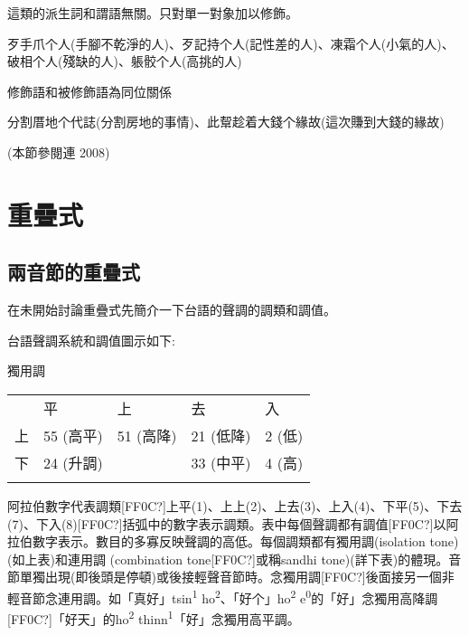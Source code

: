 \textrm{這類的派生詞和謂語無關。只對單一對象加以修飾。}

\textrm{歹手爪个人(手腳不乾淨的人)}、\textrm{歹記持个人(記性差的人)}、\textrm{凍霜个人(小氣的人)}、\textrm{破相个人(殘缺的人)}、\textrm{躼骹个人(高挑的人)}

\begin{listWWviiiNumxivleveli}
\item \begin{styleqwerty}\rmfamily
修飾語和被修飾語為同位關係
\end{styleqwerty}
\end{listWWviiiNumxivleveli}

\textrm{分割厝地个代誌(分割房地的事情)}、\textrm{此幚趁着大錢个緣故(這次賺到大錢的緣故)}

\rmfamily
(本節參閱連 2008)

\section{\rmfamily 重疊式}
\subsection{\rmfamily 兩音節的重疊式}

\textrm{在未開始討論重疊式先簡介一下台語的聲調的調類和調值。}

\rmfamily
台語聲調系統和調值圖示如下:

獨用調

\tablefirsthead{}

\tabletail{}
\tablelasttail{}
\begin{tabularx}{\textwidth}{XXXXX} & 平 & 上 & 去 & 入\\
\lsptoprule
上 & 55 (高平) & 51 (高降) & 21 (低降) & 2 (低)\\
下 & 24 (升調) &  & 33 (中平) & 4 (高)\\
\lspbottomrule
\end{tabularx}
\textrm{阿拉伯數字代表調類[FF0C?]上平(1)}、\textrm{上上(2)}、\textrm{上去(3)}、\textrm{上入(4)}、\textrm{下平(5)}、\textrm{下去(7)}、\textrm{下入(8)}[FF0C?]\textrm{括弧中的數字表示調類。表中每個聲調都有調值[FF0C?]以阿拉伯數字表示。數目的多寡反映聲調的高低。每個調類都有獨用調(isolation tone)(如上表)和連用調 (combination tone[FF0C?]或稱sandhi tone)(詳下表)的體現。音節單獨出現(即後頭是停頓)或後接輕聲音節時。念獨用調[FF0C?]後面接另一個非輕音節念連用調。如「真好」tsin}\textrm{\textsuperscript{1}} \textrm{ho}\textrm{\textsuperscript{2}}、\textrm{「好个」ho}\textrm{\textsuperscript{2}} \textrm{e}\textrm{\textsuperscript{0}}\textrm{的「好」念獨用高降調[FF0C?]「好天」的ho}\textrm{\textsuperscript{2}} \textrm{thinn}\textrm{\textsuperscript{1}}\textrm{「好」念獨用高平調。}

